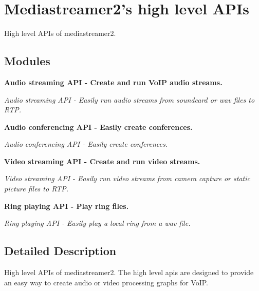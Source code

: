 \section{Mediastreamer2's high level APIs}
\label{group__mediastreamer2__high__api}


High level APIs of mediastreamer2.  
\subsection*{Modules}
\begin{DoxyCompactItemize}
\item 
{\bf Audio streaming API -\/ Create and run VoIP audio streams.}


\begin{DoxyCompactList}\small\item\em Audio streaming API -\/ Easily run audio streams from soundcard or wav files to RTP. \item\end{DoxyCompactList}\item 
{\bf Audio conferencing API -\/ Easily create conferences.}


\begin{DoxyCompactList}\small\item\em Audio conferencing API -\/ Easily create conferences. \item\end{DoxyCompactList}\item 
{\bf Video streaming API -\/ Create and run video streams.}


\begin{DoxyCompactList}\small\item\em Video streaming API -\/ Easily run video streams from camera capture or static picture files to RTP. \item\end{DoxyCompactList}\item 
{\bf Ring playing API -\/ Play ring files.}


\begin{DoxyCompactList}\small\item\em Ring playing API -\/ Easily play a local ring from a wav file. \item\end{DoxyCompactList}\end{DoxyCompactItemize}


\subsection{Detailed Description}
High level APIs of mediastreamer2. The high level apis are designed to provide an easy way to create audio or video processing graphs for VoIP. 